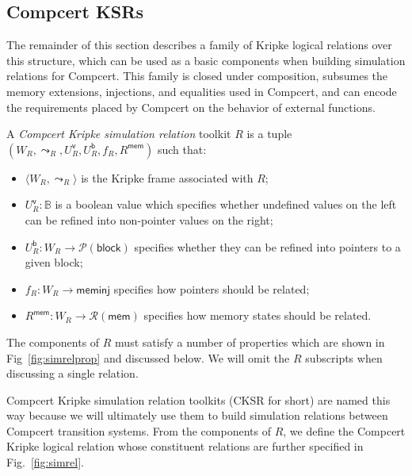\documentclass[sigplan,10pt,review,anonymous]{acmart}
\newcommand{\kw}[1]{\ensuremath{ \textsf{#1} }}
\begin{document}

\subsection{Compcert KSRs} %

The remainder of this section describes
a family of Kripke logical relations over this structure,
which can be used as a basic components
when building simulation relations for Compcert.
This family is closed under composition,
subsumes the memory extensions, injections, and equalities
used in Compcert,
and can encode the requirements placed by Compcert
on the behavior of external functions.

\begin{definition}
A \emph{Compcert Kripke simulation relation} toolkit $R$
is a tuple $(W_R, \leadsto_R, U^\kw{v}_R, U^\kw{b}_R, f_R, R^\kw{mem})$
such that:
\begin{itemize}
\item $\langle W_R, \leadsto_R \rangle$
  is the Kripke frame associated with $R$;
\item $U^\kw{v}_R : \mathbb{B}$
  is a boolean value which specifies whether undefined values on the left
  can be refined into non-pointer values on the right;
\item $U^\kw{b}_R : W_R \rightarrow \mathcal{P}(\kw{block})$
  specifies whether they can be refined into pointers to a given block;
\item $f_R : W_R \rightarrow \kw{meminj}$
  specifies how pointers should be related;
\item $R^\kw{mem} : W_R \rightarrow \mathcal{R}(\kw{mem})$
  specifies how memory states should be related.
\end{itemize}
The components of $R$ must satisfy
a number of properties which are shown in Fig~\ref{fig:simrelprop}
and discussed below.
We will omit the $R$ subscripts when discussing a single relation.
\end{definition}

Compcert Kripke simulation relation toolkits (CKSR for short)
are named this way because we will ultimately
use them to build simulation relations between
Compcert transition systems.
From the components of $R$,
we define the Compcert Kripke logical relation
whose constituent relations are further specified in Fig.~\ref{fig:simrel}.
\end{document}
